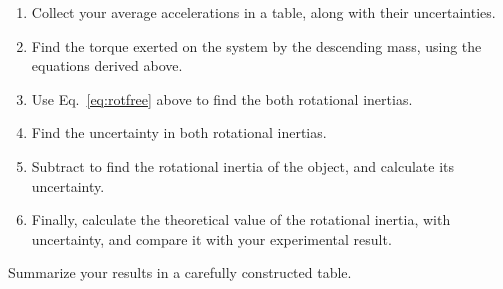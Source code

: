 \begin{enumerate}
\item
Collect your average accelerations in a table, along with their
uncertainties.
%
\item Find the torque exerted on the system by the descending mass,
using the equations derived above.
%
\item Use Eq.~\ref{eq:rotfree} above to find the both rotational
inertias.
%
\item Find the uncertainty in both rotational inertias.
%
\item Subtract to find the rotational inertia of the object,
and calculate its uncertainty.
%
\item Finally, calculate the theoretical value of the rotational
inertia, with uncertainty, and compare it with your experimental
result.
\end{enumerate}
Summarize your results in a carefully constructed table.

%
%
%
%


